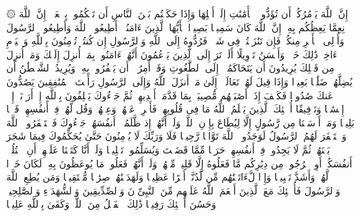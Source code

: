 \startbuffer[\q:4:58]
۞ إِنَّ ٱللَّهَ یَأۡمُرُكُمۡ أَن تُؤَدُّوا۟ ٱلۡأَمَٰنَٰتِ إِلَىٰۤ أَهۡلِهَا وَإِذَا حَكَمۡتُم بَیۡنَ ٱلنَّاسِ أَن تَحۡكُمُوا۟ بِٱلۡعَدۡلِۚ إِنَّ ٱللَّهَ نِعِمَّا یَعِظُكُم بِهِۦۤۗ إِنَّ ٱللَّهَ كَانَ سَمِیعَۢا بَصِیرࣰا%
\stopbuffer%
\startbuffer[\q:4:59]
یَٰۤأَیُّهَا ٱلَّذِینَ ءَامَنُوۤا۟ أَطِیعُوا۟ ٱللَّهَ وَأَطِیعُوا۟ ٱلرَّسُولَ وَأُو۟لِی ٱلۡأَمۡرِ مِنكُمۡۖ فَإِن تَنَٰزَعۡتُمۡ فِی شَیۡءࣲ فَرُدُّوهُ إِلَى ٱللَّهِ وَٱلرَّسُولِ إِن كُنتُمۡ تُؤۡمِنُونَ بِٱللَّهِ وَٱلۡیَوۡمِ ٱلۡءَاخِرِۚ ذَٰلِكَ خَیۡرࣱ وَأَحۡسَنُ تَأۡوِیلًا%
\stopbuffer%
\startbuffer[\q:4:60]
أَلَمۡ تَرَ إِلَى ٱلَّذِینَ یَزۡعُمُونَ أَنَّهُمۡ ءَامَنُوا۟ بِمَاۤ أُنزِلَ إِلَیۡكَ وَمَاۤ أُنزِلَ مِن قَبۡلِكَ یُرِیدُونَ أَن یَتَحَاكَمُوۤا۟ إِلَى ٱلطَّٰغُوتِ وَقَدۡ أُمِرُوۤا۟ أَن یَكۡفُرُوا۟ بِهِۦۖ وَیُرِیدُ ٱلشَّیۡطَٰنُ أَن یُضِلَّهُمۡ ضَلَٰلَۢا بَعِیدࣰا%
\stopbuffer%
\startbuffer[\q:4:61]
وَإِذَا قِیلَ لَهُمۡ تَعَالَوۡا۟ إِلَىٰ مَاۤ أَنزَلَ ٱللَّهُ وَإِلَى ٱلرَّسُولِ رَأَیۡتَ ٱلۡمُنَٰفِقِینَ یَصُدُّونَ عَنكَ صُدُودࣰا%
\stopbuffer%
\startbuffer[\q:4:62]
فَكَیۡفَ إِذَاۤ أَصَٰبَتۡهُم مُّصِیبَةُۢ بِمَا قَدَّمَتۡ أَیۡدِیهِمۡ ثُمَّ جَاۤءُوكَ یَحۡلِفُونَ بِٱللَّهِ إِنۡ أَرَدۡنَاۤ إِلَّاۤ إِحۡسَٰنࣰا وَتَوۡفِیقًا%
\stopbuffer%
\startbuffer[\q:4:63]
أُو۟لَٰۤئِكَ ٱلَّذِینَ یَعۡلَمُ ٱللَّهُ مَا فِی قُلُوبِهِمۡ فَأَعۡرِضۡ عَنۡهُمۡ وَعِظۡهُمۡ وَقُل لَّهُمۡ فِیۤ أَنفُسِهِمۡ قَوۡلَۢا بَلِیغࣰا%
\stopbuffer%
\startbuffer[\q:4:64]
وَمَاۤ أَرۡسَلۡنَا مِن رَّسُولٍ إِلَّا لِیُطَاعَ بِإِذۡنِ ٱللَّهِۚ وَلَوۡ أَنَّهُمۡ إِذ ظَّلَمُوۤا۟ أَنفُسَهُمۡ جَاۤءُوكَ فَٱسۡتَغۡفَرُوا۟ ٱللَّهَ وَٱسۡتَغۡفَرَ لَهُمُ ٱلرَّسُولُ لَوَجَدُوا۟ ٱللَّهَ تَوَّابࣰا رَّحِیمࣰا%
\stopbuffer%
\startbuffer[\q:4:65]
فَلَا وَرَبِّكَ لَا یُؤۡمِنُونَ حَتَّىٰ یُحَكِّمُوكَ فِیمَا شَجَرَ بَیۡنَهُمۡ ثُمَّ لَا یَجِدُوا۟ فِیۤ أَنفُسِهِمۡ حَرَجࣰا مِّمَّا قَضَیۡتَ وَیُسَلِّمُوا۟ تَسۡلِیمࣰا%
\stopbuffer%
\startbuffer[\q:4:66]
وَلَوۡ أَنَّا كَتَبۡنَا عَلَیۡهِمۡ أَنِ ٱقۡتُلُوۤا۟ أَنفُسَكُمۡ أَوِ ٱخۡرُجُوا۟ مِن دِیَٰرِكُم مَّا فَعَلُوهُ إِلَّا قَلِیلࣱ مِّنۡهُمۡۖ وَلَوۡ أَنَّهُمۡ فَعَلُوا۟ مَا یُوعَظُونَ بِهِۦ لَكَانَ خَیۡرࣰا لَّهُمۡ وَأَشَدَّ تَثۡبِیتࣰا%
\stopbuffer%
\startbuffer[\q:4:67]
وَإِذࣰا لَّءَاتَیۡنَٰهُم مِّن لَّدُنَّاۤ أَجۡرًا عَظِیمࣰا%
\stopbuffer%
\startbuffer[\q:4:68]
وَلَهَدَیۡنَٰهُمۡ صِرَٰطࣰا مُّسۡتَقِیمࣰا%
\stopbuffer%
\startbuffer[\q:4:69]
وَمَن یُطِعِ ٱللَّهَ وَٱلرَّسُولَ فَأُو۟لَٰۤئِكَ مَعَ ٱلَّذِینَ أَنۡعَمَ ٱللَّهُ عَلَیۡهِم مِّنَ ٱلنَّبِیِّۦنَ وَٱلصِّدِّیقِینَ وَٱلشُّهَدَاۤءِ وَٱلصَّٰلِحِینَۚ وَحَسُنَ أُو۟لَٰۤئِكَ رَفِیقࣰا%
\stopbuffer%
\startbuffer[\q:4:70]
ذَٰلِكَ ٱلۡفَضۡلُ مِنَ ٱللَّهِۚ وَكَفَىٰ بِٱللَّهِ عَلِیمࣰا%
\stopbuffer%
